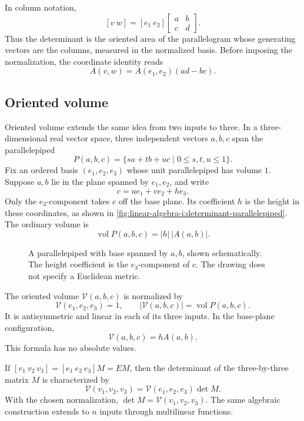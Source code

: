 In column notation,
\[
  [v\ w]=[e_1\ e_2]\begin{bmatrix}a&b\\c&d\end{bmatrix}.
\]
Thus the determinant is the oriented area of the parallelogram whose
generating vectors are the columns, measured in the normalized basis.
Before imposing the normalization, the coordinate identity reads
\[
  A(v,w)=A(e_1,e_2)(ad-bc).
\]

\subsection{Oriented volume}

Oriented volume extends the same idea from two inputs to three. In a
three-dimensional real vector space, three independent vectors
\(a,b,c\) span the parallelepiped
\[
  P(a,b,c)=\{sa+tb+uc\mid 0\leq s,t,u\leq1\}.
\]
Fix an ordered basis \((e_1,e_2,e_3)\) whose unit parallelepiped has
volume \(1\). Suppose \(a,b\) lie in the plane spanned by \(e_1,e_2\),
and write
\[
  c=ue_1+ve_2+he_3.
\]
Only the \(e_3\)-component takes \(c\) off the base plane. Its coefficient
\(h\) is the height in these coordinates, as shown in
\autoref{fig:linear-algebra-i:determinant-parallelepiped}.
The ordinary volume is
\[
  \operatorname{vol}P(a,b,c)=|h|\,|A(a,b)|.
\]

\begin{figure}[htbp]
  \centering
  
  \caption[Parallelepiped and its height coefficient]{A parallelepiped with base spanned by \(a,b\), shown
    schematically. The height coefficient is the \(e_3\)-component of
    \(c\). The drawing does not specify a Euclidean metric.}
  \label{fig:linear-algebra-i:determinant-parallelepiped}
\end{figure}

The oriented volume \(\mathcal V(a,b,c)\) is normalized by
\[
  \mathcal V(e_1,e_2,e_3)=1,
  \qquad |\mathcal V(a,b,c)|=\operatorname{vol}P(a,b,c).
\]
It is antisymmetric and linear in each of its three inputs. In the
base-plane configuration,
\[
  \mathcal V(a,b,c)=hA(a,b).
\]
This formula has no absolute values.

If \([v_1\ v_2\ v_3]=[e_1\ e_2\ e_3]M=EM\), then the determinant
of the three-by-three matrix \(M\) is characterized by
\[
  \mathcal V(v_1,v_2,v_3)=\mathcal V(e_1,e_2,e_3)\det M.
\]
With the chosen normalization, \(\det M=\mathcal V(v_1,v_2,v_3)\).
The same algebraic construction extends to \(n\) inputs through
multilinear functions.
